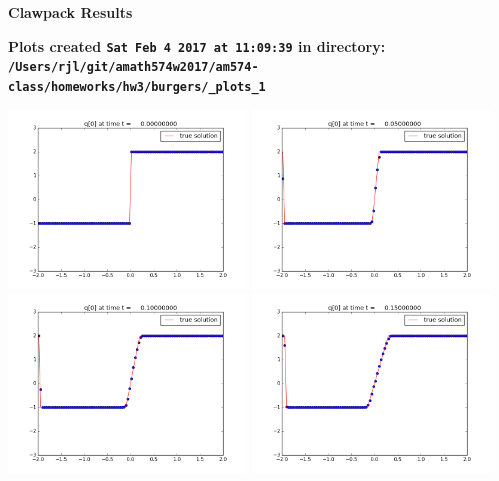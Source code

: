 \documentclass[11pt]{article}
\begin{document}
        \begin{center}{\Large\bf Clawpack Results}\vskip 5pt
        
        \bf Plots created {\tt Sat Feb  4 2017 at 11:09:39} in directory: \vskip 5pt
        \verb+/Users/rjl/git/amath574w2017/am574-class/homeworks/hw3/burgers/_plots_1+
        \end{center}
        \vskip 5pt
        \includegraphics[width=0.475\textwidth]{frame0000fig1.png}
\vskip 10pt 
\includegraphics[width=0.475\textwidth]{frame0001fig1.png}
\vskip 10pt 
\includegraphics[width=0.475\textwidth]{frame0002fig1.png}
\vskip 10pt 
\includegraphics[width=0.475\textwidth]{frame0003fig1.png}
\end{document}
